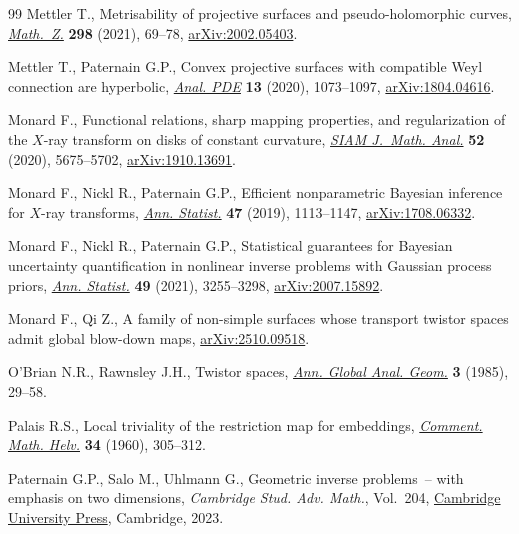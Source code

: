 \begin{thebibliography}{99}
Mettler T., Metrisability of projective surfaces and pseudo-holomorphic curves,
 \href{https://doi.org/10.1007/s00209-020-02586-6}{\textit{Math.~Z.}}
 \textbf{298} (2021), 69--78,
 \href{http://arxiv.org/abs/2002.05403}{arXiv:2002.05403}.

Mettler T., Paternain G.P., Convex projective surfaces with compatible {W}eyl
 connection are hyperbolic,
 \href{https://doi.org/10.2140/apde.2020.13.1073}{\textit{Anal. PDE}}
 \textbf{13} (2020), 1073--1097,
 \href{http://arxiv.org/abs/1804.04616}{arXiv:1804.04616}.

Monard F., Functional relations, sharp mapping properties, and regularization
 of the {$X$}-ray transform on disks of constant curvature,
 \href{https://doi.org/10.1137/20M1311508}{\textit{SIAM J.~Math. Anal.}}
 \textbf{52} (2020), 5675--5702,
 \href{http://arxiv.org/abs/1910.13691}{arXiv:1910.13691}.

Monard F., Nickl R., Paternain G.P., Efficient nonparametric {B}ayesian
 inference for {$X$}-ray transforms,
 \href{https://doi.org/10.1214/18-AOS1708}{\textit{Ann. Statist.}} \textbf{47}
 (2019), 1113--1147, \href{http://arxiv.org/abs/1708.06332}{arXiv:1708.06332}.

Monard F., Nickl R., Paternain G.P., Statistical guarantees for {B}ayesian
 uncertainty quantification in nonlinear inverse problems with {G}aussian
 process priors, \href{https://doi.org/10.1214/21-aos2082}{\textit{Ann.
 Statist.}} \textbf{49} (2021), 3255--3298,
 \href{http://arxiv.org/abs/2007.15892}{arXiv:2007.15892}.

Monard F., Qi Z., A family of non-simple surfaces whose transport twistor
 spaces admit global blow-down maps,
 \href{http://arxiv.org/abs/2510.09518}{arXiv:2510.09518}.

O'Brian N.R., Rawnsley J.H., Twistor spaces,
 \href{https://doi.org/10.1007/BF00054490}{\textit{Ann. Global Anal. Geom.}}
 \textbf{3} (1985), 29--58.

Palais R.S., Local triviality of the restriction map for embeddings,
 \href{https://doi.org/10.1007/BF02565942}{\textit{Comment. Math. Helv.}}
 \textbf{34} (1960), 305--312.

Paternain G.P., Salo M., Uhlmann G., Geometric inverse problems~-- with
 emphasis on two dimensions, \textit{Cambridge Stud. Adv. Math.}, Vol.~204,
 \href{https://doi.org/10.1017/9781009039901}{Cambridge University Press},
 Cambridge, 2023.


\end{thebibliography}
